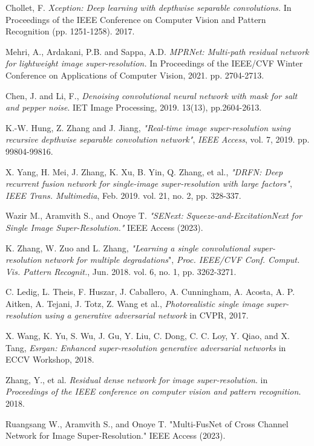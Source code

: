 \documentclass[journal]{IEEEtran}
\begin{document}
\begin{thebibliography}{00}
 Chollet, F. \textit{Xception: Deep learning with depthwise separable convolutions.} In Proceedings of the IEEE Conference on Computer Vision and Pattern Recognition (pp. 1251-1258). 2017.

 Mehri, A., Ardakani, P.B. and Sappa, A.D. \textit{MPRNet: Multi-path residual network for lightweight image super-resolution.} In Proceedings of the IEEE/CVF Winter Conference on Applications of Computer Vision, 2021. pp. 2704-2713.

 Chen, J. and Li, F., \textit{Denoising convolutional neural network with mask for salt and pepper noise}. IET Image Processing, 2019. 13(13), pp.2604-2613.

 K.-W. Hung, Z. Zhang and J. Jiang, \textit{"Real-time image super-resolution using recursive depthwise separable convolution network"}, \textit{IEEE Access}, vol. 7, 2019. pp. 99804-99816.

 X. Yang, H. Mei, J. Zhang, K. Xu, B. Yin, Q. Zhang, et al., \textit{"DRFN: Deep recurrent fusion network for single-image super-resolution with large factors"}, \textit{IEEE Trans. Multimedia}, Feb. 2019. vol. 21, no. 2, pp. 328-337.

 Wazir M., Aramvith S., and Onoye T. \textit{"SENext: Squeeze-and-ExcitationNext for Single Image Super-Resolution." }IEEE Access (2023).

 K. Zhang, W. Zuo and L. Zhang, \textit{"Learning a single convolutional super-resolution network for multiple degradations}", \textit{Proc. IEEE/CVF Conf. Comput. Vis. Pattern Recognit.}, Jun. 2018. vol. 6, no. 1, pp. 3262-3271.

 C. Ledig, L. Theis, F. Huszar, J. Caballero, A. Cunningham, A. Acosta, A. P. Aitken, A. Tejani, J. Totz, Z. Wang et al., \textit{Photorealistic single image super-resolution using a generative adversarial network} in CVPR, 2017.

 X. Wang, K. Yu, S. Wu, J. Gu, Y. Liu, C. Dong, C. C. Loy, Y. Qiao, and X. Tang, \textit{Esrgan: Enhanced super-resolution generative adversarial networks} in ECCV Workshop, 2018.

 Zhang, Y., et al. \textit{Residual dense network for image super-resolution}. in \textit{Proceedings of the IEEE conference on computer vision and pattern recognition}. 2018.

 Ruangsang W., Aramvith S., and Onoye T. "Multi-FusNet of Cross Channel Network for Image Super-Resolution." IEEE Access (2023).


\end{thebibliography}
\end{document}
